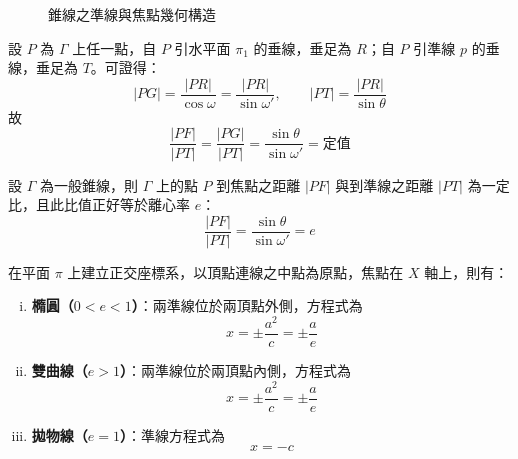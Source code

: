 \begin{figure}[H]
\caption{錐線之準線與焦點幾何構造}
\label{fig:b4-2-5-1}
\end{figure}

設 $P$ 為 $\Gamma$ 上任一點，自 $P$ 引水平面 $\pi_1$ 的垂線，垂足為 $R$；自 $P$ 引準線 $p$ 的垂線，垂足為 $T$。可證得：
\[ |PG| = \frac{|PR|}{\cos\omega} = \frac{|PR|}{\sin\omega'}, \qquad |PT| = \frac{|PR|}{\sin\theta} \]
故
\[ \frac{|PF|}{|PT|} = \frac{|PG|}{|PT|} = \frac{\sin\theta}{\sin\omega'} = \text{定值} \]

\begin{theorem}[定理 4（準線性質）]
設 $\Gamma$ 為一般錐線，則 $\Gamma$ 上的點 $P$ 到焦點之距離 $|PF|$ 與到準線之距離 $|PT|$ 為一定比，且此比值正好等於離心率 $e$：
\begin{equation}
\frac{|PF|}{|PT|} = \frac{\sin\theta}{\sin\omega'} = e \label{eq:b4-2-5-1}
\end{equation}
\end{theorem}

在平面 $\pi$ 上建立正交座標系，以頂點連線之中點為原點，焦點在 $X$ 軸上，則有：
\begin{enumerate}[(i)]
  \item \textbf{橢圓（$0 < e < 1$）}：兩準線位於兩頂點外側，方程式為
  \begin{equation}
  x = \pm \frac{a^2}{c} = \pm \frac{a}{e} \label{eq:b4-2-5-ell-dir}
  \end{equation}
  \item \textbf{雙曲線（$e > 1$）}：兩準線位於兩頂點內側，方程式為
  \begin{equation}
  x = \pm \frac{a^2}{c} = \pm \frac{a}{e} \label{eq:b4-2-5-hyp-dir}
  \end{equation}
  \item \textbf{拋物線（$e = 1$）}：準線方程式為
  \begin{equation}
  x = -c \label{eq:b4-2-5-par-dir}
  \end{equation}
\end{enumerate}

